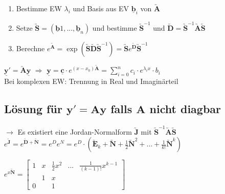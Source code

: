 \documentclass[6pt,a4paper]{scrartcl}
\newcommand{\mat}[1]{\ensuremath{\begin{bmatrix} #1 \end{bmatrix}}}				%
\newcommand{\ma}[1]{\ensuremath{\utilde{\boldsymbol {#1}}}}						%
\renewcommand{\vec}[1]{\ensuremath{\underline{\boldsymbol {#1}}}}
\newcommand{\Ra}[0]{\ensuremath{\Rightarrow}}									%
\newcommand{\ra}[0]{\ensuremath{\rightarrow}} 									%
\newcommand{\bs}[1]{\ensuremath{\boldsymbol{#1}}}								%
\newcommand{\R}{\ensuremath{\mathbb R}}
\begin{document}
\begin{multicols}{4}
	

	
	\begin{enumerate}
		\item Bestimme EW $\lambda_i$ und Basis aus EV $\vec b_i$ von $\ma A$
		\item Setze $\ma S = (\vec b1, ..., \vec b_n)$ und bestimme $\ma S^{-1}$ und $\ma D = \ma S^{-1} \ma A \ma S$
		\item Berechne $e^{\ma A} = \exp(\ma S \ma D \ma S^{-1}) = \ma S e^{\ma D} \ma S^{-1} $
	\end{enumerate}
	
	
	$\vec y' = \ma A \vec y$ \quad $\Ra$ \quad $\vec y = \vec c \cdot e^{(x-x_0)\ma A} = \sum\limits_{i = 0}^n c_i \cdot e^{\lambda_i x} \cdot b_i$\\
	
	Bei komplexen EW: Trennung in Real und Imaginärteil
	
	\subsection{Lösung für $\bs y' = \bs A \bs y$ falls $\bs A$ nicht diagbar}
 	$\ra$	Es existiert eine Jordan-Normalform $\ma J$ mit $\ma S^{-1} \ma A \ma S$\\
	
	
	$e^{\ma J} = e^{\ma D + \ma N} = e^{D} e^{N} = e^D \cdot (\ma E_k + \ma N + \frac{1}{2} \ma N^2 + ... + \frac{1}{k!} \ma N^k)$
	
	$e^{x\ma N} =  \mat{1 & x & \frac{1}{2} x^2 & ... & \frac{1}{(k-1)!} x^{k-1} \\ & 1 & x & & \\ 0 & & 1 & }$
	

\end{multicols}
\end{document}
